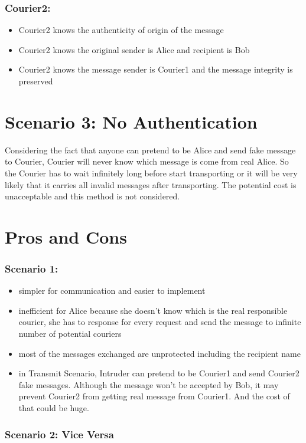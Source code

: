\documentclass{article}
\begin{document}
\subsubsection*{Courier2:}
\begin{itemize}
\item Courier2 knows the authenticity of origin of the message
\item Courier2 knows the original sender is Alice and recipient is Bob
\item Courier2 knows the message sender is Courier1 and the message integrity is preserved
\end{itemize}
\vspace{40pt}


\section*{Scenario 3: No Authentication}
Considering the fact that anyone can pretend to be Alice and send fake message to Courier, Courier will never know which message is come from real Alice. So the Courier has to wait infinitely long before start transporting or it will be very likely that it carries all invalid messages after transporting. The potential cost is unacceptable and this method is not considered.
\vspace{40pt}

\section*{Pros and Cons}
\subsubsection*{Scenario 1:}
\begin{itemize}
\item simpler for communication and easier to implement
\item inefficient for Alice\newline
because she doesn't know which is the real responsible courier, she has to response for every request and send the message to infinite number of potential couriers
\item most of the messages exchanged are unprotected including the recipient name
\item in Transmit Scenario, Intruder can pretend to be Courier1 and send Courier2 fake messages. Although the message won't be accepted by Bob, it may prevent Courier2 from getting real message from Courier1. And the cost of that could be huge.
\end{itemize}
\subsubsection*{Scenario 2: Vice Versa}
\end{document}
